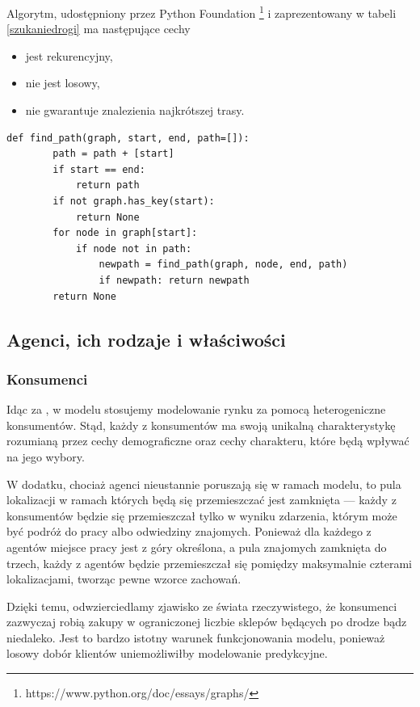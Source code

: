 \documentclass[polish, twoside, 12pt, a4paper]{article}
\theoremstyle{definition}
\theoremstyle{plain}
\theoremstyle{remark}
\begin{document}
Algorytm, udostępniony przez Python Foundation \footnote{https://www.python.org/doc/essays/graphs/} i zaprezentowany w tabeli \ref{szukaniedrogi} ma następujące cechy
	\begin{itemize}
		\item jest rekurencyjny,
		\item nie jest losowy,
		\item nie gwarantuje znalezienia najkrótszej trasy.
	\end{itemize}

\begin{lstlisting}[frame=single, label=szukaniedrogi]  
    def find_path(graph, start, end, path=[]):
        path = path + [start]
        if start == end:
            return path
        if not graph.has_key(start):
            return None
        for node in graph[start]:
            if node not in path:
                newpath = find_path(graph, node, end, path)
                if newpath: return newpath
        return None
\end{lstlisting}

\subsection{Agenci, ich rodzaje i właściwości}
\subsubsection{Konsumenci} 

Idąc za \cite{Kaminski2012}, w modelu stosujemy modelowanie rynku za pomocą heterogeniczne konsumentów. Stąd, każdy z konsumentów ma swoją unikalną charakterystykę rozumianą przez cechy demograficzne oraz cechy charakteru, które będą wpływać na jego wybory. 

W dodatku, chociaż agenci nieustannie poruszają się w ramach modelu, to pula lokalizacji w ramach których będą się przemieszczać jest zamknięta --- każdy z konsumentów będzie się przemieszczał tylko w wyniku zdarzenia, którym może być podróż do pracy albo odwiedziny znajomych. Ponieważ dla każdego z agentów miejsce pracy jest z góry określona, a pula znajomych zamknięta do trzech, każdy z agentów będzie przemieszczał się pomiędzy maksymalnie czterami lokalizacjami, tworząc pewne wzorce zachowań. 

Dzięki temu, odwzierciedlamy zjawisko ze świata rzeczywistego, że konsumenci zazwyczaj robią zakupy w ograniczonej liczbie sklepów będących po drodze bądz niedaleko. Jest to bardzo istotny warunek funkcjonowania modelu, ponieważ losowy dobór klientów uniemożliwiłby modelowanie predykcyjne.
\end{document}
